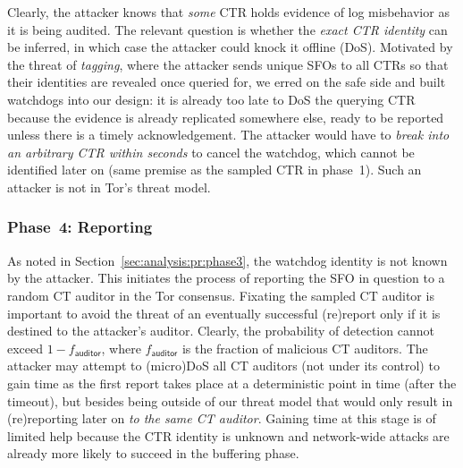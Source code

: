 Clearly, the attacker knows that \emph{some} CTR holds evidence of log
misbehavior as it is being audited.  The relevant question is whether the
\emph{exact CTR identity} can be inferred, in which case the attacker could
knock it offline (DoS).  Motivated by the threat of \emph{tagging}, where the
attacker sends unique SFOs to all CTRs so that their identities are revealed
once queried for, we erred on the safe side and built watchdogs into our design:
it is already too late to DoS the querying CTR because the evidence is already
replicated somewhere else, ready to be reported unless there is a timely
acknowledgement. The attacker would have to \emph{break into an arbitrary CTR
within seconds} to cancel the watchdog, which cannot be identified later on
(same premise as the sampled CTR in phase~1).  Such an attacker is not in Tor's
threat model.

\subsubsection{Phase~4: Reporting} \label{sec:analysis:pr:phase4} 

As noted in Section~\ref{sec:analysis:pr:phase3}, the watchdog identity is not
known by the attacker.  This initiates the process of reporting the SFO in
question to a random CT auditor in the Tor consensus. Fixating the sampled CT
auditor is important to avoid the threat of an eventually successful (re)report
only if it is destined to the attacker's auditor.  Clearly, the probability of
detection cannot exceed $1-f_{\mathsf{auditor}}$, where $f_{\mathsf{auditor}}$
is the fraction of malicious CT auditors.  The attacker may attempt to
(micro)DoS all CT auditors (not under its control) to gain time as the first
report takes place at a deterministic point in time (after the timeout), but
besides being outside of our threat model that would only result in
(re)reporting later on \emph{to the same CT auditor}. Gaining time at this stage
is of limited help because the CTR identity is unknown and network-wide attacks
are already more likely to succeed in the buffering phase.
